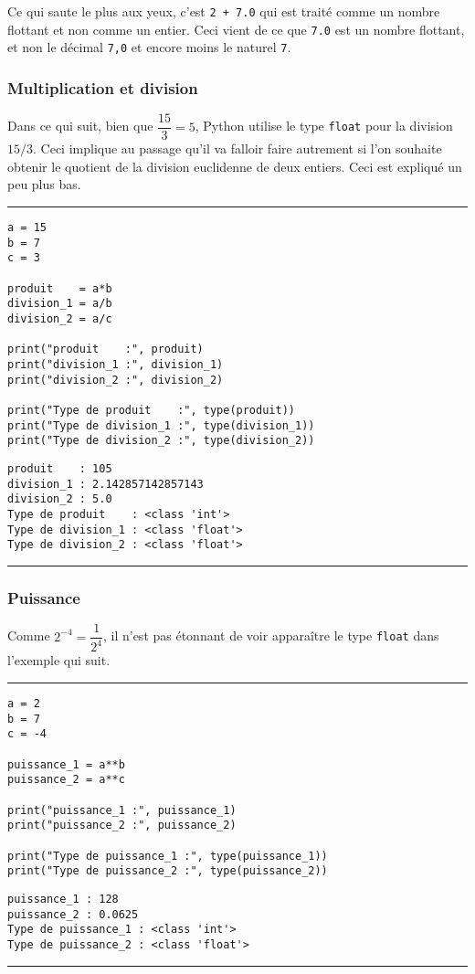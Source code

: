Ce qui saute le plus aux yeux, c'est \texttt{2 + 7.0} qui est traité comme un nombre flottant et non comme un entier. Ceci vient de ce que \texttt{7.0} est un nombre flottant, et non le décimal \texttt{7,0} et encore moins le naturel \texttt{7}.


\subsubsection{Multiplication et division}

Dans ce qui suit, bien que $\dfrac{15}{3} = 5$, Python utilise le type \texttt{float} pour la division $15 / 3$. Ceci implique au passage qu'il va falloir faire autrement si l'on souhaite obtenir le quotient de la division euclidenne de deux entiers. Ceci est expliqué un peu plus bas.

\newpage


\bigskip
{\hrule height .5mm}
\begin{verbatim}
a = 15
b = 7
c = 3

produit    = a*b
division_1 = a/b
division_2 = a/c

print("produit    :", produit)
print("division_1 :", division_1)
print("division_2 :", division_2)

print("Type de produit    :", type(produit))
print("Type de division_1 :", type(division_1))
print("Type de division_2 :", type(division_2))
\end{verbatim}
 \color{ForestGreen}
\vspace{-1.5em}
\begin{verbatim}
produit    : 105
division_1 : 2.142857142857143
division_2 : 5.0
Type de produit    : <class 'int'>
Type de division_1 : <class 'float'>
Type de division_2 : <class 'float'>
\end{verbatim} \color{Black}
{\hrule height .5mm}
\bigskip


\subsubsection{Puissance}

Comme $2^{-4} = \dfrac{1}{2^4}$, il n'est pas étonnant de voir apparaître le type \texttt{float} dans l'exemple qui suit.


\bigskip
{\hrule height .5mm}
\begin{verbatim}
a = 2
b = 7
c = -4

puissance_1 = a**b
puissance_2 = a**c

print("puissance_1 :", puissance_1)
print("puissance_2 :", puissance_2)

print("Type de puissance_1 :", type(puissance_1))
print("Type de puissance_2 :", type(puissance_2))
\end{verbatim}
 \color{ForestGreen}
\vspace{-1.5em}
\begin{verbatim}
puissance_1 : 128
puissance_2 : 0.0625
Type de puissance_1 : <class 'int'>
Type de puissance_2 : <class 'float'>
\end{verbatim} \color{Black}
{\hrule height .5mm}
\bigskip


